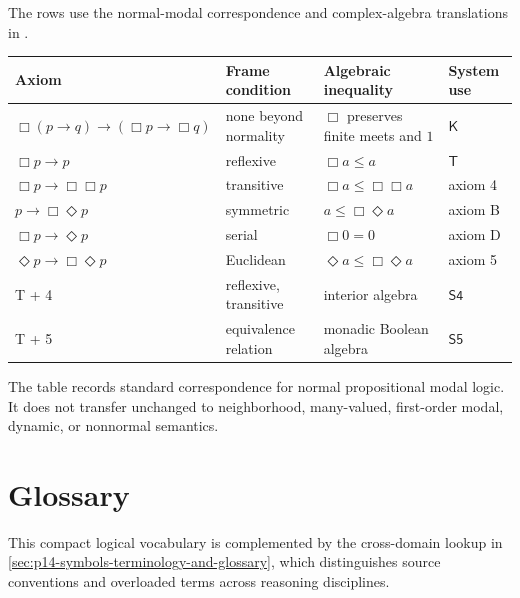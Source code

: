 The rows use the normal-modal correspondence and complex-algebra translations
in \cite{BlackburnDeRijkeVenema2001,Goldblatt1989}.

\begin{tabularx}{\textwidth}{@{}l l l X@{}}
\toprule
Axiom & Frame condition & Algebraic inequality & System use \\
\midrule
\(\Box(p\to q)\to(\Box p\to\Box q)\) & none beyond normality & \(\Box\) preserves finite meets and \(1\) & \(\mathsf K\) \\
\(\Box p\to p\) & reflexive & \(\Box a\le a\) & \(\mathsf T\) \\
\(\Box p\to\Box\Box p\) & transitive & \(\Box a\le\Box\Box a\) & axiom 4 \\
\(p\to\Box\Diamond p\) & symmetric & \(a\le\Box\Diamond a\) & axiom B \\
\(\Box p\to\Diamond p\) & serial & \(\Box0=0\) & axiom D \\
\(\Diamond p\to\Box\Diamond p\) & Euclidean & \(\Diamond a\le\Box\Diamond a\) & axiom 5 \\
T + 4 & reflexive, transitive & interior algebra & \(\mathsf{S4}\) \\
T + 5 & equivalence relation & monadic Boolean algebra & \(\mathsf{S5}\) \\
\bottomrule
\end{tabularx}

The table records standard correspondence for normal propositional modal
logic. It does not transfer unchanged to neighborhood, many-valued, first-order
modal, dynamic, or nonnormal semantics.

\section{Glossary}
\label{sec:p14-glossary}

This compact logical vocabulary is complemented by the cross-domain lookup
in \cref{sec:p14-symbols-terminology-and-glossary}, which distinguishes
source conventions and overloaded terms across reasoning disciplines.

